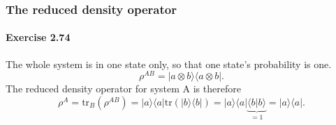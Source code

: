\documentclass[a4paper,12pt]{article}
\newcommand{\exercise}[1]{\paragraph{Exercise #1}}
\newcommand{\la}{\langle}
\newcommand{\ra}{\rangle}
\begin{document}
    \subsubsection{The reduced density operator}

    \exercise{2.74} The whole system is in one state only, so that one state's probability is one.
    \begin{equation}
        \rho^{AB} = | a \otimes b \ra \la a \otimes b | \textrm{.}
    \end{equation}
    The reduced density operator for system A is therefore
    \begin{equation}
        \rho^A = \textrm{tr}_B (\rho^{AB}) =
        | a \ra \la a | \textrm{tr}(| b \ra \la b |) =
        | a \ra \la a | \underbrace{\la b | b \ra}_{= 1} =
        | a \ra \la a | \textrm{.}
    \end{equation}
\end{document}
